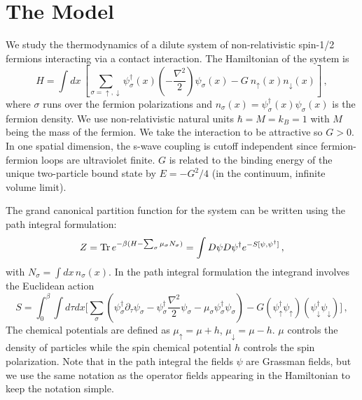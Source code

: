 \documentclass[aps,eqsecnum,amsmath,onecolumn,groupedaddress,superscriptaddress,notitlepage,nofootinbib]{revtex4-1}
\DeclareMathOperator{\Tr}{Tr}
\newcommand{\beq}{\begin{equation}}
\newcommand{\eeq}{\end{equation}}
\def\Tr {\mathop{\hbox{Tr}}}
\begin{document}
\section{The Model}\label{the-model}

\def\up{\uparrow}
\def\down{\downarrow}
We study the thermodynamics of a dilute system of non-relativistic spin-1/2 fermions 
interacting via a contact interaction. The Hamiltonian of the system is 
\beq
H =  \int dx\, \left[ \sum_{\sigma=\up,\down} \psi_\sigma^\dagger(x) \left(-\frac{\nabla^2}2 \right)
 \psi_\sigma(x) - G\ n_\up(x) n_\down(x) \right] \,,
\eeq
where $\sigma$ runs over the fermion polarizations and 
$n_\sigma(x)=\psi_\sigma^\dagger(x)\psi_\sigma(x)$ is the fermion density.
We use non-relativistic natural units $\hbar = M = k_B = 1$ with 
$M$ being the  mass of the fermion. We take the interaction to be attractive so $G>0$. 
In one spatial dimension, the s-wave coupling is cutoff independent since fermion-fermion loops are ultraviolet finite. $G$ is related to the binding energy of the unique two-particle bound state by $E= -{G^2}/{4}$ (in the continuum, infinite volume limit).

The grand canonical partition 
function for the system can be written using the path integral formulation:
\beq
Z = \Tr e^{-\beta(H-\sum_\sigma \mu_\sigma N_\sigma)} =
\int{D\psi D\psi^{\dagger}e^{-S[\psi,\psi^{\dagger}]}}\,,
\eeq
with $N_\sigma=\int dx\, n_\sigma(x)$. In the path integral formulation the integrand
involves the Euclidean action
\beq
S = \int_{0}^{\beta}\int{d\tau dx\Bigg[\sum_\sigma (\psi_{\sigma}^{\dagger}\partial_{\tau}\psi_{\sigma} - \psi_{\sigma}^{\dagger}\frac{\nabla^2}{2}\psi_{\sigma}- \mu_\sigma\psi_{\sigma}^{\dagger}\psi_{\sigma}) - G(\psi_\up^{\dagger}\psi_\up )(\psi_\down^{\dagger}\psi_\down )\Bigg]} \,,
\label{eq:continuum-action}
\eeq 
The chemical potentials are defined as $\mu_\up=\mu+h$, $\mu_\down=\mu-h$. $\mu$ controls the density of particles while the spin chemical potential $h$ controls the spin polarization. 
Note that in the path integral the fields $\psi$ are Grassman fields, but we use the same
notation as the operator fields appearing in the Hamiltonian to keep the notation simple.
\end{document}
